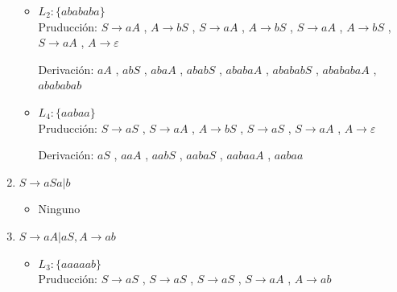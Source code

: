 \documentclass{article}
\begin{document}
\begin{enumerate}
\begin{itemize}
                    \item $ L_2 : \{abababa\}$ \\
                        Pruducción: 
                        $ S \to aA $ ,
                        $ A \to bS $ ,
                        $ S \to aA $ ,
                        $ A \to bS $ ,
                        $ S \to aA $ ,
                        $ A \to bS $ ,
                        $ S \to aA $ ,
                        $ A \to \varepsilon $ 
                        
                        Derivación:
                        $ aA $ ,
                        $ abS $ ,
                        $ abaA $ ,
                        $ ababS $ ,
                        $ ababaA $ ,
                        $ abababS $ ,
                        $ abababaA $ ,
                        $ abababab $ 
                        
                    \item $ L_4 : \{aabaa\}$ \\
                        Pruducción: 
                        $ S \to aS $ ,
                        $ S \to aA $ ,
                        $ A \to bS $ ,
                        $ S \to aS $ ,
                        $ S \to aA $ ,
                        $ A \to \varepsilon $ 
                        
                        Derivación:
                        $ aS $ ,
                        $ aaA $ ,
                        $ aabS $ ,
                        $ aabaS $ ,
                        $ aabaaA $ ,
                        $ aabaa $ 
                \end{itemize}
            
            \item $S \to aSa|b$
            
                \begin{itemize}
                    \item Ninguno
                \end{itemize}
                
                
            \item $S \to aA|aS, A \to ab$
                
                \begin{itemize}
                    \item $ L_3 : \{aaaaab\}$ \\
                        Pruducción: 
                        $ S \to aS $ ,
                        $ S \to aS $ ,
                        $ S \to aS $ ,
                        $ S \to aA $ ,
                        $ A \to ab $
                        

\end{itemize}
\end{enumerate}
\end{document}
